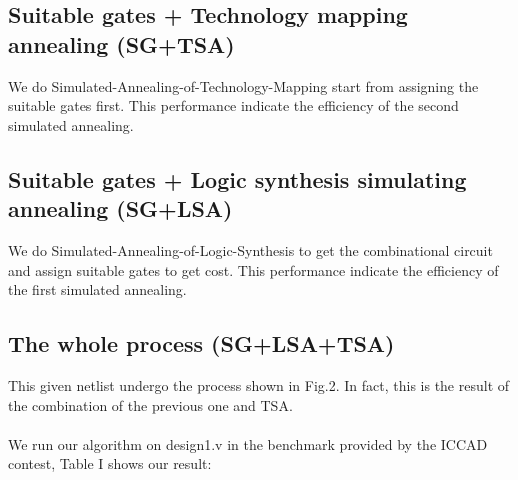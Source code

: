 \documentclass[conference]{IEEEtran}
\begin{document}
\subsection{Suitable gates + Technology mapping annealing (SG+TSA)}
We do Simulated-Annealing-of-Technology-Mapping start from assigning the suitable gates first. This performance indicate the efficiency of the second simulated annealing.
\\

\subsection{Suitable gates + Logic synthesis simulating annealing (SG+LSA)}
We do Simulated-Annealing-of-Logic-Synthesis to get the combinational circuit and assign suitable gates to get cost. This performance indicate the efficiency of the first simulated annealing.
\\

\subsection{The whole process (SG+LSA+TSA)}
This given netlist undergo the process shown in Fig.2. In fact, this is the result of the combination of the previous one and TSA.
\\
\\
We run our algorithm on design1.v in the benchmark provided by the ICCAD contest, Table I shows our result:
\end{document}
